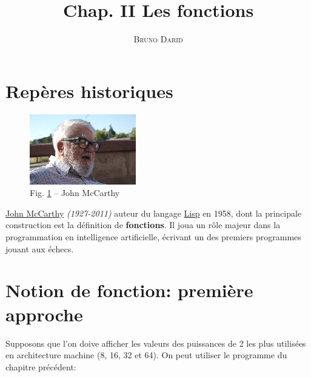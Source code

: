 \documentclass[11pt,french]{article}
\title{Chap. II Les fonctions}
\author{\textsc{Bruno Darid}}
\makeatletter
\def\maxwidth{\ifdim\Gin@nat@width>\linewidth\linewidth
    \else\Gin@nat@width\fi}
\let\Oldincludegraphics\includegraphics
\renewcommand{\includegraphics}[1]{\Oldincludegraphics[width=.8\maxwidth]{#1}}
\makeatother
\begin{document}
    \renewcommand{\contentsname}{\textsc{Plan}}    
 	\maketitle
 	\tableofcontents

    \hypertarget{repuxe8res-historiques}{%
\section{Repères historiques}\label{repuxe8res-historiques}}

\begin{figure}[h]
	\begin{center}
		\includegraphics{McCarthy.png}
	\end{center}
	\caption{Fig. \ref{fig:mccarthy} -- John McCarthy}
	\label{fig:mccarthy}
\end{figure}

\href{https://fr.wikipedia.org/wiki/John_McCarthy}{John McCarthy}
\emph{(1927-2011)} auteur du langage
\href{https://fr.wikipedia.org/wiki/Lisp}{Lisp} en 1958, dont la
principale construction est la définition de \textbf{fonctions}. Il joua
un rôle majeur dans la programmation en intelligence artificielle,
écrivant un des premiers programmes jouant aux échecs.

    \hypertarget{notion-de-fonction-premiuxe8re-approche}{%
\section{Notion de fonction: première
approche}\label{notion-de-fonction-premiuxe8re-approche}}

Supposons que l'on doive afficher les valeurs des puissances de 2 les
plus utilisées en architecture machine (8, 16, 32 et 64). On peut
utiliser le programme du chapitre précédent:
\end{document}
